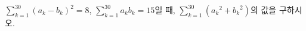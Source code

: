 $\displaystyle\sum_{k=1}^{30}(a_k-b_k)^2=8$, $\displaystyle\sum_{k=1}^{30}a_kb_k=15$일 때, $\displaystyle\sum_{k=1}^{30}({a_k}^2+{b_k}^2)$의 값을 구하시오.
